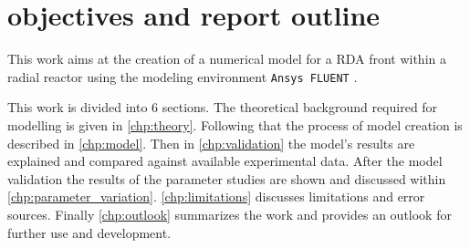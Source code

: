 \documentclass[../thesis.tex]{subfiles}
\begin{document}
\section{objectives and report outline}

This work aims at the creation of a numerical model for a RDA front within a radial reactor using the modeling environment \texttt{Ansys FLUENT} \cite{manual2009ansys}. 

This work is divided into 6 sections. The theoretical background required for modelling is given in \autoref{chp:theory}. Following that the process of model creation is described in \autoref{chp:model}. Then in \autoref{chp:validation} the model's results are explained and compared against available experimental data. After the model validation the results of the parameter studies are shown and discussed within \autoref{chp:parameter_variation}. \autoref{chp:limitations} discusses limitations and error sources. Finally \autoref{chp:outlook} summarizes the work and provides an outlook for further use and development.


\end{document}
